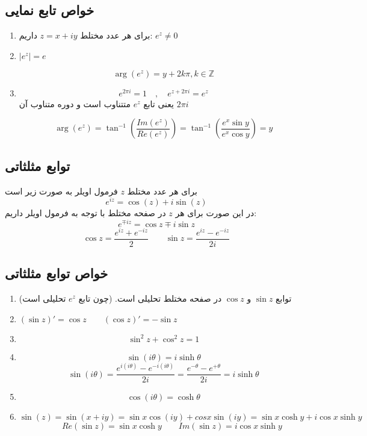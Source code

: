 \documentclass[12pt]{report}
\begin{document}
 	 	 	  \subsection{خواص تابع نمایی}
 	 	 	  \begin{enumerate}
 	 	 	  	\item 
 	 	 	  	برای هر عدد مختلط
 	 	 	  	$z = x + iy$
 	 	 	  	داریم: 
 	 	 	  	$e^z \neq 0$
 	 	 	  	\item
 	 	 	  	$|e^z| = e$
 	 	 	  	
 	 	 	  	$$\arg(e^z) = y + 2k\pi , k \in \mathbb{Z}$$
 	 	 	  	\item
 	 	 	  	$$e^{2\pi i } = 1 \quad, \quad e^{z +2\pi i} = e^z$$
 	 	 	  	یعنی تابع
 	 	 	  	$e^z$
 	 	 	  	متتناوب است و دوره متناوب آن 
 	 	 	  	$2 \pi i$
 	 	 	  	
 	 	 	  	$$\arg(e^z) = \tan^{-1}(\frac{Im(e^z)}{Re(e^z)}) = \tan^{-1}(\frac{e^x \sin y}{e^x \cos y }) = y$$
 	 	 	  	
 	 	 	  \end{enumerate}
 	 	 	  
 	 	 	  \subsection{توابع مثلثاتی}
 	 	 	  برای هر عدد مختلط
 	 	 	  $z$
 	 	 	  فرمول اویلر به صورت زیر است
 	 	 	  $$e^{iz} = \cos(z)+i \sin(z)$$
 	 	 	  در این صورت  برای هر 
 	 	 	  $z$
 	 	 	  در صفحه مختلط با توجه به فرمول اویلر داریم:
 	 	 	  $$e^{\mp iz} = \cos z \mp i\sin z$$
 	 	 	  $$\cos z = \frac{e^{iz} + e^{-iz}}{2} \qquad \sin z = \frac{e^{iz} - e^{-iz}}{2i}$$
 	 	 	  
 	 	 	  \subsection{خواص توابع مثلثاتی}
 	 	 	  \begin{enumerate}
 	 	 	  	\item 
 	 	 	  	توابع 
 	 	 	  	$\sin z$
 	 	 	  	و
 	 	 	  	$\cos z$
 	 	 	  	در صفحه مختلط تحلیلی است.
 	 	 	  (چون تابع 
 	 	 	  $e^z$
 	 	 	  تحلیلی است)
 	 	 	  \item
 	 	 	  $(\sin z)' = \cos z \qquad (\cos z)' = - \sin z$
 	 	 	  \item
 	 	 	  $$\sin^2 z + \cos^2 z = 1$$
 	 	 	  \item
 	 	 	  $$\sin (i\theta) = i \sinh \theta$$
 	 	 	  $$\sin (i\theta) = \frac{e^{i(i\theta)} - e^{-i(i\theta)}}{2i} = \frac{e^{-\theta} - e^{+\theta}}{2i} = i\sinh \theta$$
 	 	 	  \item
 	 	 	  $$\cos (i\theta) =  \cosh \theta$$
 	 	 	  \item
 	 	 	  $$\sin(z) = \sin(x + iy)  = \sin x \cos(iy)  +cos x \sin(iy) = \sin x \cosh y + i \cos x \sinh y$$
 	 	 	  $$\qquad Re(\sin z) = \sin x \cosh y \qquad Im(\sin z) = i\cos x \sinh y$$
 	 	 	  
 	 	 	  
 	 	 	  \end{enumerate}
\end{document}
